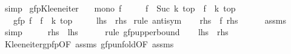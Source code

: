 \begin{isabellebody}
\ simp\isanewline
{}\isamarkupfalse%
%
\endisatagproof
{\isafoldproof}%
%
\isadelimproof
\isanewline
%
\endisadelimproof
\isanewline
{}\isamarkupfalse%
\ gfp{\isacharunderscore}{\kern0pt}Kleene{\isacharunderscore}{\kern0pt}iter{\isacharcolon}{\kern0pt}\isanewline
\ \ \ {\isachardoublequoteopen}mono\ f{\isachardoublequoteclose}\isanewline
\ \ \ \ \ {\isachardoublequoteopen}{\isacharparenleft}{\kern0pt}f\ {\isacharcircum}{\kern0pt}{\isacharcircum}{\kern0pt}\ Suc\ k{\isacharparenright}{\kern0pt}\ top\ {\isacharequal}{\kern0pt}\ {\isacharparenleft}{\kern0pt}f\ {\isacharcircum}{\kern0pt}{\isacharcircum}{\kern0pt}\ k{\isacharparenright}{\kern0pt}\ top{\isachardoublequoteclose}\isanewline
\ \ \ {\isachardoublequoteopen}gfp\ f\ {\isacharequal}{\kern0pt}\ {\isacharparenleft}{\kern0pt}f\ {\isacharcircum}{\kern0pt}{\isacharcircum}{\kern0pt}\ k{\isacharparenright}{\kern0pt}\ top{\isachardoublequoteclose}\isanewline
\ \ \ \ {\isacharparenleft}{\kern0pt}\ {\isachardoublequoteopen}{\isacharquery}{\kern0pt}lhs\ {\isacharequal}{\kern0pt}\ {\isacharquery}{\kern0pt}rhs{\isachardoublequoteclose}{\isacharparenright}{\kern0pt}\isanewline
%
\isadelimproof
%
\endisadelimproof
%
\isatagproof
{}\isamarkupfalse%
\ {\isacharparenleft}{\kern0pt}rule\ antisym{\isacharparenright}{\kern0pt}\isanewline
\ \ \isamarkupfalse%
\ {\isachardoublequoteopen}{\isacharquery}{\kern0pt}rhs\ {\isasymle}\ f\ {\isacharquery}{\kern0pt}rhs{\isachardoublequoteclose}\isanewline
\ \ \ \ \isamarkupfalse%
\ assms{\isacharparenleft}{\kern0pt}{}{\isacharparenright}{\kern0pt}\ \isamarkupfalse%
\ simp\isanewline
\ \ \isamarkupfalse%
\ \isamarkupfalse%
\ {\isachardoublequoteopen}{\isacharquery}{\kern0pt}rhs\ {\isasymle}\ {\isacharquery}{\kern0pt}lhs{\isachardoublequoteclose}\isanewline
\ \ \ \ \isamarkupfalse%
\ {\isacharparenleft}{\kern0pt}rule\ gfp{\isacharunderscore}{\kern0pt}upperbound{\isacharparenright}{\kern0pt}\isanewline
\ \ \isamarkupfalse%
\ {\isachardoublequoteopen}{\isacharquery}{\kern0pt}lhs\ {\isasymle}\ {\isacharquery}{\kern0pt}rhs{\isachardoublequoteclose}\isanewline
\ \ \ \ \isamarkupfalse%
\ Kleene{\isacharunderscore}{\kern0pt}iter{\isacharunderscore}{\kern0pt}gpfp{\isacharbrackleft}{\kern0pt}OF\ assms{\isacharparenleft}{\kern0pt}{}{\isacharparenright}{\kern0pt}{\isacharbrackright}{\kern0pt}\ gfp{\isacharunderscore}{\kern0pt}unfold{\isacharbrackleft}{\kern0pt}OF\ assms{\isacharparenleft}{\kern0pt}{}{\isacharparenright}{\kern0pt}{\isacharbrackright}{\kern0pt}\ \isamarkupfalse%

\end{isabellebody}
